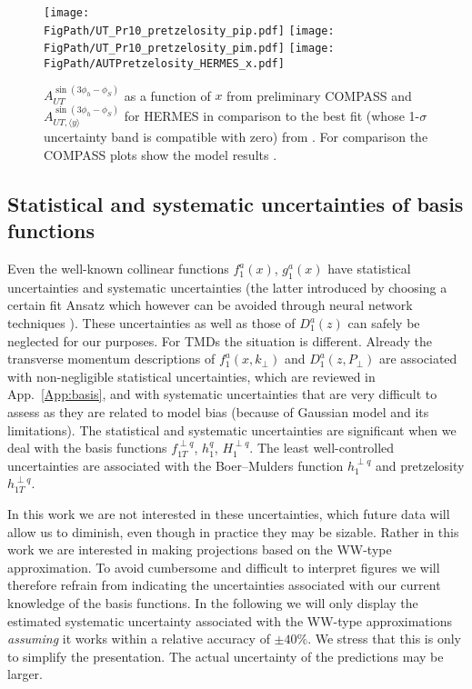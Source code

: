 \documentclass[a4paper,11pt]{article}
\def\kperp{k_\perp}
\def\pperp{P_\perp}
\newcommand*{\FigPath}{./figs}%
\begin{document}
\begin{figure}[b!]
\centering
\texttt{[image: \\FigPath/UT\_Pr10\_pretzelosity\_pip.pdf]}%
\texttt{[image: \\FigPath/UT\_Pr10\_pretzelosity\_pim.pdf]}%
\texttt{[image: \\FigPath/AUTPretzelosity\_HERMES\_x.pdf]}%

\caption{\label{aut_h1tp_jlab} $A_{UT}^{\sin(3 \phi_h - \phi_S)}$
	as a function of $x$ from preliminary COMPASS \cite{Parsamyan:2013fia}
	and $A_{UT,\langle y\rangle}^{\sin(3 \phi_h - \phi_S)}$ for HERMES
	\cite{Schnell:2010zza} in comparison to the best fit
	(whose 1-$\sigma$ uncertainty band is compatible with zero)
	from \cite{Lefky:2014eia}. For comparison the COMPASS plots
	show the model results \cite{Kotzinian:2008fe,Boffi:2009sh}.
	}
\end{figure}

\newpage

\subsection{Statistical and systematic uncertainties of basis functions}

Even the well-known collinear functions $f_1^a(x)$, $g_1^a(x)$ have
statistical uncertainties and systematic uncertainties (the latter
introduced by choosing a certain fit Ansatz which however can be
avoided through neural network techniques \cite{Ball:2014uwa}).
These uncertainties as well as those of $D_1^a(z)$ can safely
be neglected for our purposes.
For TMDs the situation is different. Already the transverse
momentum descriptions of $f_1^a(x,\kperp)$ and $D_1^a(z,\pperp)$
are associated with non-negligible statistical uncertainties,
which are reviewed in App.~\ref{App:basis}, and with systematic
uncertainties that are very difficult to assess as they are
related to model bias (because of Gaussian model and its limitations).
The statistical and systematic uncertainties are significant
when we deal with the basis functions
$f_{1T}^{\perp q}$, $h_{1}^{q}$, $H_{1}^{\perp q}$.
The least well-controlled uncertainties are associated with the
Boer--Mulders function $h_1^{\perp q}$ and pretzelosity $h_{1T}^{\perp q}$.

In this work we are not interested in these uncertainties, which
future data will allow us to diminish, even though in practice
they may be sizable. Rather in this work we are interested in
making projections based on the WW-type approximation. To avoid
cumbersome and difficult to interpret figures we will therefore
refrain from indicating the uncertainties associated with our
current knowledge of the basis functions. In the following
we will only display the estimated systematic uncertainty
associated with the WW-type approximations {\it assuming}
it works within a relative accuracy of $\pm40\%$.
We stress that this is only to simplify the presentation. The
actual uncertainty of the predictions may be larger.
\end{document}
